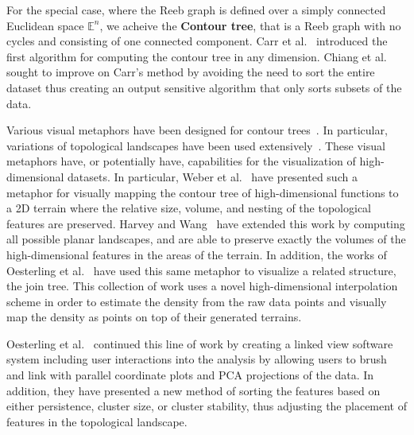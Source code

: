 
For the special case, where the Reeb graph is defined over a simply connected Euclidean space $\mathbb{E}^n$, we acheive the \textbf{Contour tree}, that is a Reeb graph with no cycles and consisting of one connected component.
%
Carr et al.~\cite{CarrSnoeyinkAxen2003} introduced the first algorithm for computing the contour tree in any dimension.
%
Chiang et al.~\cite{ChiangLenzLu2005} sought to improve on Carr's method by avoiding the need to sort the entire dataset thus creating an output sensitive algorithm that only sorts subsets of the data.
%

Various visual metaphors have been designed for contour trees~\cite{PascucciCole-McLaughlinScorzelli2009,WeberBremerPascucci2012}.
%
In particular, variations of topological landscapes have been used extensively~\cite{BeketayevMorozovWeber2012,DemirBeketayevWeber2012,HarveyWang2010,OesterlingHeineJanicke2010,OesterlingHeineJanicke2011,WeberBremerPascucci2007}.
%
These visual metaphors have, or potentially have, capabilities for the visualization of high-dimensional datasets.
%
In particular, Weber et al.~\cite{WeberBremerPascucci2007} have presented such a metaphor for visually mapping the contour tree of high-dimensional functions to a 2D terrain where the relative size, volume, and nesting of the topological features are preserved.
%
Harvey and Wang~\cite{HarveyWang2010} have extended this work by computing all possible planar landscapes, and are able to preserve exactly the volumes of the high-dimensional features in the areas of the terrain.
%
In addition, the works of Oesterling et al.~\cite{OesterlingHeineJanicke2010,OesterlingHeineJanicke2011} have used this same metaphor to visualize a related structure, the join tree.
%
This collection of work uses a novel high-dimensional interpolation scheme in order to estimate the density from the raw data points and visually map the density as points on top of their generated terrains.

Oesterling et al.~\cite{OesterlingHeineGunther2013} continued this line of work by creating a linked view software system including user interactions into the analysis by allowing users to brush and link with parallel coordinate plots and PCA projections of the data.
%
In addition, they have presented a new method of sorting the features based on either persistence, cluster size, or cluster stability, thus adjusting the placement of features in the topological landscape.


